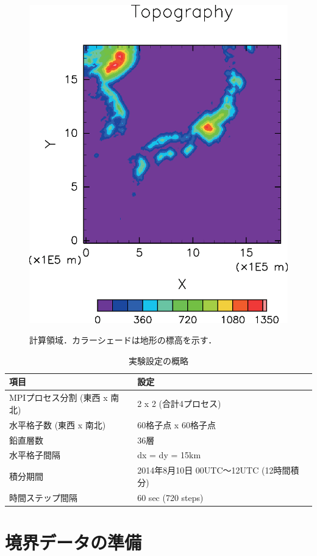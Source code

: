 \begin{figure}[h]
\begin{center}
  \includegraphics[width=0.5\hsize]{./figure/real_domain.eps}\\
  \caption{計算領域．カラーシェードは地形の標高を示す．}
  \label{fig:domain}
\end{center}
\end{figure}

\begin{table}[h]
\begin{center}
  \caption{実験設定の概略}
  \label{tab:grids}
  \begin{tabularx}{150mm}{|l|X|} \hline
    \rowcolor[gray]{0.9} 項目 & 設定 \\ \hline
    MPIプロセス分割 (東西 x 南北) & 2 x 2 (合計4プロセス) \\ \hline
    水平格子数 (東西 x 南北) & 60格子点 x 60格子点 \\ \hline
    鉛直層数                 & 36層                  \\ \hline
    水平格子間隔             & dx = dy = 15km       \\ \hline
    積分期間 & 2014年8月10日 00UTC～12UTC (12時間積分) \\ \hline
    時間ステップ間隔 & 60 sec (720 steps) \\ \hline
  \end{tabularx}
\end{center}
\end{table}


\section{境界データの準備}

